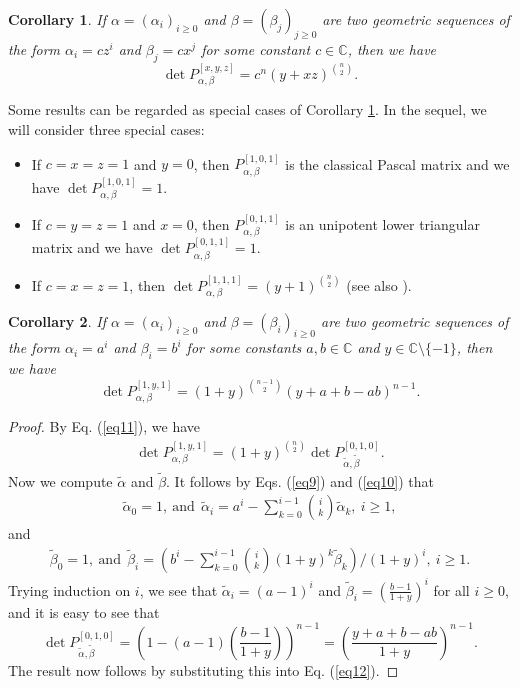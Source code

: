 \documentclass{amsart}
\newtheorem{corollary}{Corollary}
\begin{document}
\begin{corollary}\label{cor2} If $\alpha=(\alpha_i)_{i\geq 0}$ and $\beta=(\beta_j)_{j\geq 0}$ are two geometric sequences of the form $\alpha_i=cz^i$ and $\beta_j=cx^j$ for some constant $c\in \mathbb{C}$, then we have
\[
\det P_{\alpha,\beta}^{[x, y, z]}=c^n(y+xz)^{\binom{n}{2}}.
\]
\end{corollary} 

Some results can be regarded as special cases of Corollary \ref{cor2}. In the sequel, we will consider three special cases:
\begin{itemize}
\item[-] If $c=x=z=1$ and $y=0$, then $P_{\alpha,\beta}^{[1, 0, 1]}$ is the classical Pascal matrix and we have $\det P_{\alpha,\beta}^{[1, 0, 1]}=1$.
\item[-] If $c=y=z=1$ and $x=0$, then $P_{\alpha,\beta}^{[0, 1, 1]}$ is an unipotent lower triangular matrix and we have 
$\det P_{\alpha,\beta}^{[0, 1, 1]}=1$.
\item[-] If $c=x=z=1$, then $\det P_{\alpha,\beta}^{[1, 1, 1]}=(y+1)^{\binom{n}{2}}$ (see also \cite[Theorem 1]{K2}).
\end{itemize}
 
 
 \begin{corollary}\cite[Theorem 1]{K2}\label{cor3} If $\alpha=(\alpha_i)_{i\geq 0}$ and $\beta=(\beta_i)_{i\geq 0}$ are two geometric sequences of the form $\alpha_i=a^i$ and $\beta_i=b^i$ for some constants $a, b\in \mathbb{C}$ and $y\in \mathbb{C}\setminus \{-1\}$, then we have
\[
\det P_{\alpha,\beta}^{[1, y, 1]}=(1+y)^{\binom{n-1}{2}}(y+a+b-ab)^{n-1}.
\]
\end{corollary} 
\begin{proof} By Eq. (\ref{eq11}), we have 
 \begin{align}\label{eq12} \det P_{\alpha,\beta}^{[1, y, 1]}=(1+y)^{\binom{n}{2}} \det P_{\widetilde{\alpha}, \widetilde{\beta}}^{[0,1,0]}.
 \end{align}
Now we compute $\widetilde{\alpha}$ and $\widetilde{\beta}$. It follows by Eqs. (\ref{eq9}) and (\ref{eq10}) that 
\begin{align*} \widetilde{\alpha}_{0}=1, \ \text{and} \ \  \widetilde{\alpha}_{i}=a^i-\sum_{k=0}^{i-1}\binom{i}{k} \widetilde{\alpha}_k, \   i\geq 1,
\end{align*}
and 
 \begin{align*} \widetilde{\beta}_{0}=1, \  \text{and} \ \  \widetilde{\beta}_{i}=\left(b^i-\sum_{k=0}^{i-1} \binom{i}{k}(1+y)^k \widetilde{\beta}_k\right)/(1+y)^i, \  i\geq 1.\end{align*}
 Trying induction on $i$, we see that $\widetilde{\alpha}_{i}=(a-1)^i$ and $ \widetilde{\beta}_i=\left(\frac{b-1}{1+y}\right)^i$ for all $i\geq 0$, and it is easy to see that 
$$\det P_{\widetilde{\alpha}, \widetilde{\beta}}^{[0,1,0]}=\left(1-(a-1)\left(\frac{b-1}{1+y}\right)\right)^{n-1}=\left(\frac{y+a+b-ab}{1+y}\right)^{n-1}.$$
The result now follows by substituting this into Eq. (\ref{eq12}). \end{proof}
 
\end{document}
